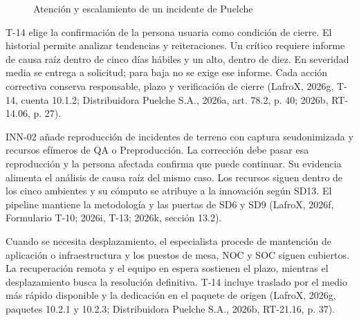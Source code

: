\begin{figure}[htbp]
\centering
{}
\caption{Atención y escalamiento de un incidente de Puelche}
\label{fig:sd10-incidente}
\end{figure}

T-14 elige la confirmación de la persona usuaria como condición de cierre. El historial permite analizar tendencias y reiteraciones. Un crítico requiere informe de causa raíz dentro de cinco días hábiles y un alto, dentro de diez. En severidad media se entrega a solicitud; para baja no se exige ese informe. Cada acción correctiva conserva responsable, plazo y verificación de cierre (LafroX, 2026g, T-14, cuenta 10.1.2; Distribuidora Puelche S.A., 2026a, art. 78.2, p. 40; 2026b, RT-14.06, p. 27).

INN-02 añade reproducción de incidentes de terreno con captura seudonimizada y recursos efímeros de QA o Preproducción. La corrección debe pasar esa reproducción y la persona afectada confirma que puede continuar. Su evidencia alimenta el análisis de causa raíz del mismo caso. Los recursos siguen dentro de los cinco ambientes y su cómputo se atribuye a la innovación según SD13. El pipeline mantiene la metodología y las puertas de SD6 y SD9 (LafroX, 2026f, Formulario T-10; 2026i, T-13; 2026k, sección 13.2).

Cuando se necesita desplazamiento, el especialista procede de mantención de aplicación o infraestructura y los puestos de mesa, NOC y SOC siguen cubiertos. La recuperación remota y el equipo en espera sostienen el plazo, mientras el desplazamiento busca la resolución definitiva. T-14 incluye traslado por el medio más rápido disponible y la dedicación en el paquete de origen (LafroX, 2026g, paquetes 10.2.1 y 10.2.3; Distribuidora Puelche S.A., 2026b, RT-21.16, p. 37).

